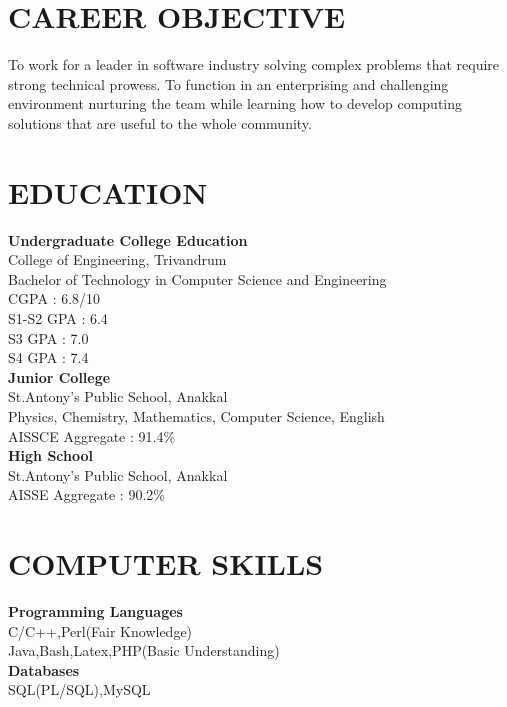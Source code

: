 \documentclass[line,margin]{res}
\begin{document}


\address{joji\_antony@gmx.com}
\address{+91 98092 28749}

\begin{resume}
\section{CAREER OBJECTIVE}
To work for a leader in software industry solving complex problems that require strong technical prowess. To function in an enterprising and challenging environment nurturing the team while learning how to develop computing solutions that are useful to the whole community.
  
  \section{EDUCATION}

{\bf Undergraduate College Education}\\
College of Engineering, Trivandrum\\
Bachelor of Technology in Computer Science and Engineering\\
CGPA : 6.8/10\\
S1-S2 GPA : 6.4\\
S3 GPA    : 7.0\\
S4 GPA    : 7.4\\

{\bf Junior College} \\
St.Antony's Public School, Anakkal\\
Physics, Chemistry, Mathematics, Computer Science, English\\
AISSCE Aggregate : 91.4\%\\

{\bf High School} \\
St.Antony's Public School, Anakkal\\
AISSE Aggregate : 90.2\%\\

\section{COMPUTER SKILLS}
{\bf Programming Languages}\\
C/C++,Perl(Fair Knowledge)\\
Java,Bash,Latex,PHP(Basic Understanding)\\
{\bf Databases}\\
SQL(PL/SQL),MySQL\\


\end{resume}
\end{document}
